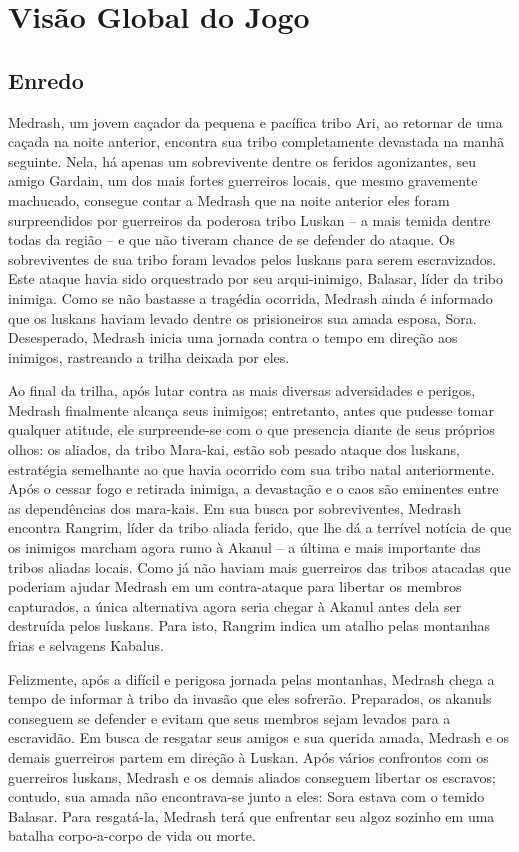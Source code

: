 \section{Visão Global do Jogo}

\subsection{Enredo}
Medrash, um jovem caçador da pequena e pacífica tribo Ari, ao retornar de uma caçada na noite anterior, encontra sua tribo completamente devastada na manhã seguinte. Nela, há apenas um sobrevivente dentre os feridos agonizantes, seu amigo Gardain, um dos mais fortes guerreiros locais, que mesmo gravemente machucado, consegue contar a Medrash que na noite anterior eles foram surpreendidos por guerreiros da poderosa tribo Luskan – a mais temida dentre todas da região – e que não tiveram chance de se defender do ataque. Os sobreviventes de sua tribo foram levados pelos luskans para serem escravizados. Este ataque havia sido orquestrado por seu arqui-inimigo, Balasar, líder da tribo inimiga. Como se não bastasse a tragédia ocorrida, Medrash ainda é informado que os luskans haviam levado dentre os prisioneiros sua amada esposa, Sora.  Desesperado, Medrash inicia uma jornada contra o tempo em direção aos inimigos, rastreando a trilha deixada por eles. 

Ao final da trilha, após lutar contra as mais diversas adversidades e perigos, Medrash finalmente alcança seus inimigos; entretanto, antes que pudesse tomar qualquer atitude, ele  surpreende-se com o que presencia diante de seus próprios olhos: os aliados, da tribo Mara-kai, estão sob pesado ataque dos luskans, estratégia semelhante ao que havia ocorrido com sua tribo natal anteriormente. Após o cessar fogo e retirada inimiga, a devastação e o caos são eminentes entre as dependências dos mara-kais. Em sua busca por sobreviventes, Medrash encontra Rangrim, líder da tribo aliada ferido, que lhe dá a terrível notícia de que os inimigos marcham agora rumo à Akanul – a última e mais importante das tribos aliadas locais. Como já não haviam mais guerreiros das tribos atacadas que poderiam ajudar Medrash em um contra-ataque para libertar os membros capturados, a única alternativa agora seria chegar à Akanul antes dela ser destruída pelos luskans. Para isto, Rangrim indica um atalho pelas montanhas frias e selvagens Kabalus. 

Felizmente, após a difícil e perigosa jornada pelas montanhas, Medrash chega a tempo de informar à tribo da invasão que eles sofrerão. Preparados, os akanuls conseguem se defender e evitam que seus membros sejam levados para a escravidão. Em busca de resgatar seus amigos e sua querida amada, Medrash e os demais guerreiros partem em direção à Luskan. Após vários confrontos com os guerreiros luskans, Medrash e os demais aliados conseguem libertar os escravos; contudo, sua amada não encontrava-se junto a eles: Sora estava com o temido Balasar. Para resgatá-la, Medrash terá que enfrentar seu algoz sozinho em uma batalha corpo-a-corpo de vida ou morte.

